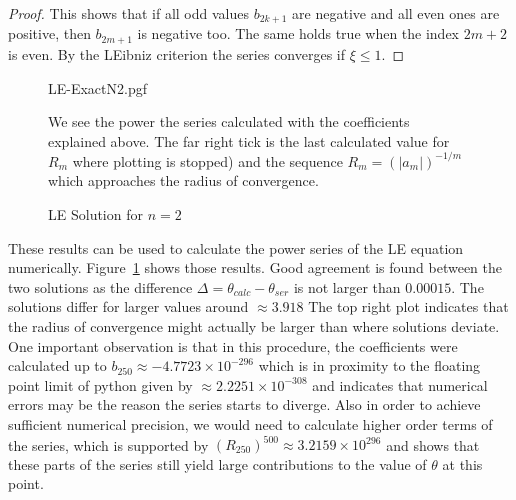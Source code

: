 \begin{appendix}
\begin{section}
\begin{proof}
	This shows that if all odd values $b_{2k+1}$ are negative and all even ones are positive, 
	then $b_{2m+1}$ is negative too.
	The same holds true when the index $2m+2$ is even.
	By the \ac{LE}ibniz criterion the series converges if $\xi\leq1$. 
\end{proof}
\begin{figure}[H]
	{\centering
	{LE-ExactN2.pgf}
	}
	\caption[ Solution for $n=2$]{\ac{LE} Solution for $n=2$}
	\label{99-App-Plt-LEN2-Plot}
	\small
	We see the power the series calculated with the coefficients explained above.
	The far right tick is the last calculated value for $R_m$ where plotting is stopped) and the sequence $R_m=(|a_m|)^{-1/m}$ which approaches the radius of convergence.
\end{figure}\noindent
These results can be used to calculate the power series of the \ac {LE} equation numerically.
Figure~\ref{99-App-Plt-LEN2-Plot} shows those results.
Good agreement is found between the two solutions
as the difference $\Delta=\theta_{calc}-\theta_{ser}$ is not larger than $0.00015$.
The solutions differ for larger values around $\approx3.918$
The top right plot indicates that the radius of convergence might actually be larger than 
where solutions deviate. 
One important observation is that in this procedure, the coefficients were calculated up to $b_{250}\approx-4.7723\times10^{-296}$ which is in proximity to the floating point limit of python given by $\approx2.2251\times10^{-308}$ and indicates that numerical errors may be the reason the series starts to diverge.
Also in order to achieve sufficient numerical precision, we would need to calculate higher order terms of the series, which is supported by $(R_{250})^{500}\approx3.2159\times10^{296}$ and shows that these parts of the series still yield large contributions to the value of $\theta$ at this point.
%
%
%

\end{section}
\end{appendix}
